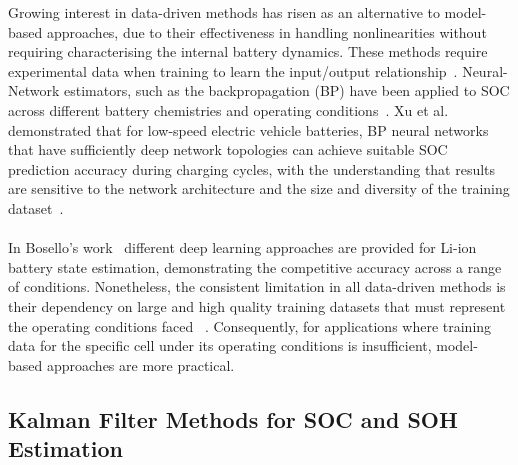 Growing interest in data-driven methods has risen as an alternative to model-based approaches, due to their effectiveness in handling
nonlinearities without requiring characterising the internal battery dynamics. These methods require experimental data
when training to learn the input/output relationship~\cite{SOHBook}. Neural-Network estimators, such as the backpropagation (\acs{BP})
have been applied to \acs{SOC} across different battery chemistries and operating conditions~\cite{SOCLowSpeedNeuralNetwork}.
Xu et al. demonstrated that for low-speed electric vehicle batteries, \acs{BP} neural networks that have
sufficiently deep network topologies can achieve suitable \acs{SOC} prediction accuracy during charging cycles, with the understanding that
results are sensitive to the network architecture and the size and diversity of the training dataset~\cite{SOCLowSpeedNeuralNetwork}.
\\
\\
In Bosello's work~\cite{Bosello2025} different deep learning approaches are provided for \acs{Li-ion} battery state estimation, 
demonstrating the competitive accuracy across a range of conditions. Nonetheless, the consistent limitation in all data-driven 
methods is their dependency on large and high quality training datasets that must represent the operating conditions faced~\cite{EKFEV}
\cite{Bosello2025}. Consequently, for applications where training data for the specific cell under its operating conditions is
insufficient, model-based approaches are more practical.

\subsection{Kalman Filter Methods for \acs{SOC} and \acs{SOH} Estimation}

